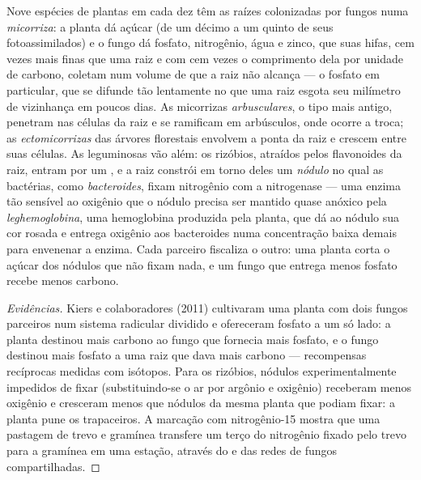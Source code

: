 \begin{proposition}\label{prop:b2:living-soil:symbiosis}
Nove espécies de plantas em cada dez têm as raízes colonizadas por
fungos numa \emph{micorriza}: a planta dá açúcar (de um décimo a um
quinto de seus fotoassimilados) e o fungo dá fosfato, nitrogênio, água e
zinco, que suas hifas, cem vezes mais finas que uma raiz e com cem vezes
o comprimento dela por unidade de carbono, coletam num volume de  que
a raiz não alcança --- o fosfato em particular, que se difunde tão
lentamente no  que uma raiz esgota seu milímetro de vizinhança em
poucos dias. As micorrizas \emph{arbusculares}, o tipo mais antigo,
penetram nas células da raiz e se ramificam em arbúsculos, onde ocorre a
troca; as \emph{ectomicorrizas} das árvores florestais envolvem a ponta
da raiz e crescem entre suas células. As leguminosas vão além: os
rizóbios, atraídos pelos flavonoides da raiz, entram por um , e a raiz constrói em torno deles um \emph{nódulo} no qual as
bactérias, como \emph{bacteroides}, fixam nitrogênio com a nitrogenase
--- uma enzima tão sensível ao oxigênio que o nódulo precisa ser mantido
quase anóxico pela \emph{leghemoglobina}, uma hemoglobina produzida pela
planta, que dá ao nódulo sua cor rosada e entrega oxigênio aos
bacteroides numa concentração baixa demais para envenenar a enzima. Cada
parceiro fiscaliza o outro: uma planta corta o açúcar dos nódulos que
não fixam nada, e um fungo que entrega menos fosfato recebe menos
carbono.
\end{proposition}
\begin{proof}[Evidências]
Kiers e colaboradores (2011) cultivaram uma planta com dois fungos
parceiros num sistema radicular dividido e ofereceram fosfato a um só
lado: a planta destinou mais carbono ao fungo que fornecia mais fosfato,
e o fungo destinou mais fosfato a uma raiz que dava mais carbono ---
recompensas recíprocas medidas com isótopos. Para os rizóbios, nódulos
experimentalmente impedidos de fixar (substituindo-se o ar por argônio e
oxigênio) receberam menos oxigênio e cresceram menos que nódulos da mesma
planta que podiam fixar: a planta pune os trapaceiros. A marcação com
nitrogênio-15 mostra que uma pastagem de trevo e gramínea transfere um
terço do nitrogênio fixado pelo trevo para a gramínea em uma estação,
através do  e das redes de fungos compartilhadas.
\end{proof}

